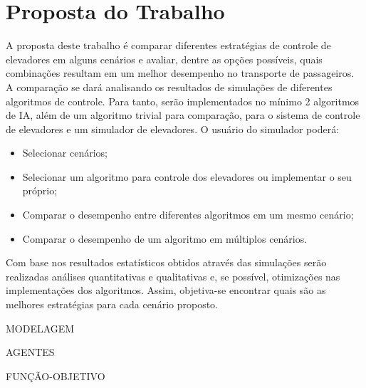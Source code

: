 \chapter{\label{chap:proposal}Proposta do Trabalho}

{\color{red}A proposta deste trabalho é comparar diferentes estratégias de
  controle de elevadores em alguns cenários e avaliar, dentre as opções
  possíveis, quais combinações resultam em um melhor desempenho no transporte de
  passageiros. A comparação se dará analisando os resultados de simulações de
  diferentes algoritmos de controle. Para tanto, serão implementados no mínimo 2
  algoritmos de IA, além de um algoritmo trivial para comparação, para o sistema
 de controle de elevadores e um simulador de elevadores. O usuário do simulador poderá:

\begin{itemize}
  \item Selecionar cenários;
  \item Selecionar um algoritmo para controle dos elevadores ou implementar o seu próprio;
  \item Comparar o desempenho entre diferentes algoritmos em um mesmo cenário;
  \item Comparar o desempenho de um algoritmo em múltiplos cenários.
\end{itemize}

Com base nos resultados estatísticos obtidos através das simulações serão realizadas análises quantitativas e qualitativas e, se possível, otimizações nas implementações dos algoritmos. Assim, objetiva-se encontrar quais são as melhores estratégias para cada cenário proposto.}

MODELAGEM

AGENTES

FUNÇÃO-OBJETIVO